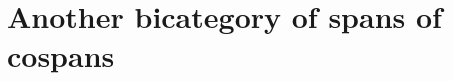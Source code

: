 \documentclass{amsart}
\begin{document}
%

\section{Another bicategory of spans of cospans}





 
% 
\end{document}
